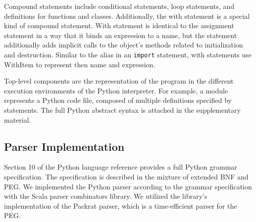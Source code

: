 Compound statements include conditional statements, loop statements,
and definitions for functions and classes.
Additionally, the with statement is a special kind of compound statement.
With statement is identical to the assignment statement 
in a way that it binds an expression to a name, 
but the statement additionally adds implicit calls
to the object's methods related to initialization and destruction.
Similar to the alias in an {\tt import} statement,
with statements use WithItem to represent then name and expression.

Top-level components are the representation of the program
in the different execution environments of the Python interpreter.
For example, a module represents a Python code file, composed of
multiple definitions specified by statements. 
The full Python abstract syntax is attached in the supplementary material.

\subsection{Parser Implementation}

Section 10 of the Python language reference\cite{pythonref}
provides a full Python grammar specification.
The specification is described in the mixture of 
extended BNF and PEG\cite{bryan2004peg}. We implemented the Python parser
according to the grammar specification with the Scala parser combinators 
library\cite{scalaparser}. We utilized the library's implementation of
the Packrat parser\cite{bryan02packrat}, which is a time-efficient parser
for the PEG.


